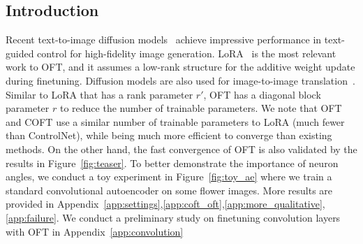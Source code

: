 \begin{itemize}[leftmargin=*,nosep]
\begin{itemize}[leftmargin=*,nosep]
\begin{abstract}
We propose a simple extension to the original OFT by additionally learning a magnitude scaling coefficient for each neuron. \textbf{Model finetuning}. It slightly limits the scalability of OFT. For each method, we select the model that achieves the best validation CLIP metrics. To gain more insights on the Cayley transform, we apply the Neumann series to approximate $\thickmuskip=2mu \medmuskip=2mu \bm{R}=(\bm{I}+\bm{Q})(I-\bm{Q})^{-1}$ as $\thickmuskip=2mu \medmuskip=2mu \bm{R}\approx\bm{I}+2\bm{Q}+\mathcal{O}(\bm{Q}^2)$ (under the assumption that the Neumann  {\parfillskip=0pt\par}

series converges in the operator norm). To compare fairly to LoRA, we only apply OFT to finetune the attention weights in our experiments. Motivated by such an invariance, we propose Orthogonal Finetuning~(OFT) which adapts large text-to-image diffusion models to a downstream task without changing its hyperspherical energy. Thus the inference speed is the same as the pretrained model. All the methods adopt the same loss function as in DreamBooth. As a form of finetuning, adaptation methods (\emph{e.g.}, \cite{hulora2022,houlsby2019parameter,pfeiffer2020adapterfusion}) are heavily studied in natural language processing. \end{abstract}

\section{Introduction}

Recent text-to-image diffusion models~\cite{saharia2022photorealistic,ramesh2022hierarchical,rombach2022high} achieve impressive performance in text-guided control for high-fidelity image generation. LoRA~\cite{hulora2022} is the most relevant work to OFT, and it assumes a low-rank structure for the additive weight update during finetuning. Diffusion models are also used for image-to-image translation~\cite{saharia2022palette,voynov2022sketch,wang2022pretraining}. Similar to LoRA that has a rank parameter $r'$, OFT has a diagonal block parameter $r$ to reduce the number of trainable parameters. We note that OFT and COFT use a similar number of trainable parameters to LoRA (much fewer than ControlNet), while being much more efficient to converge than existing methods. On the other hand, the fast convergence of OFT is also validated by the results in Figure~\ref{fig:teaser}. To better demonstrate the importance of neuron angles, we conduct a toy experiment in Figure~\ref{fig:toy_ae} where we train a standard convolutional autoencoder on some flower images. More results are provided in Appendix~\ref{app:settings},\ref{app:coft_oft},\ref{app:more_qualitative},\ref{app:failure}. We conduct a preliminary study on finetuning convolution layers with OFT in Appendix~\ref{app:convolution}


\end{itemize}
\end{itemize}
